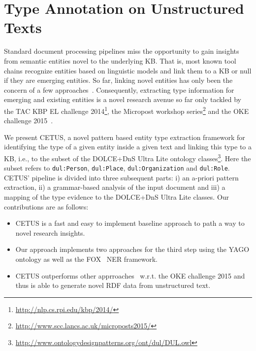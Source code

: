 \chapter{Type Annotation on Unstructured Texts}
\label{cha:cetus}


Standard document processing pipelines miss the opportunity to gain insights from semantic entities novel to the underlying \ac{KB}. 
That is, most known tool chains recognize entities based on linguistic models and link them to a \ac{KB} or null if they are emerging entities. 
So far, linking novel entities has only been the concern of a few approaches~\cite{AIDA,agdistis_iswc}.
Consequently, extracting type information for emerging and existing entities is a novel research avenue so far only tackled by the TAC KBP \ac{EL} challenge 2014\footnote{\url{http://nlp.cs.rpi.edu/kbp/2014/}}, the Micropost workshop series\footnote{\url{http://www.scc.lancs.ac.uk/microposts2015/}} and the OKE challenge 2015~\cite{okechallenge}.

We present CETUS, a novel pattern based entity type extraction framework for identifying the type of a given entity inside a given text and linking this type to a \ac{KB}, i.e., to the subset of the DOLCE+DnS Ultra Lite ontology classes\footnote{\url{http://www.ontologydesignpatterns.org/ont/dul/DUL.owl}}.
Here the subset refers to \texttt{dul:Person}, \texttt{dul:Place}, \texttt{dul:Organization} and \texttt{dul:Role}.
CETUS' pipeline is divided into three subsequent parts: i) an a-priori pattern extraction, ii) a grammar-based analysis of the input document and iii) a mapping of the type evidence to the DOLCE+DnS Ultra Lite classes. 
Our contributions are as follows:
\begin{itemize}
\item CETUS is a fast and easy to implement baseline approach to path a way to novel research insights.
\item Our approach implements two approaches for the third step using the YAGO ontology as well as the FOX~\cite{FOX} \ac{NER} framework.
\item CETUS outperforms other apprroaches~\cite{okechallenge} w.r.t. the OKE challenge 2015 and thus is able to generate novel \ac{RDF} data from unstructured text.
\end{itemize}

